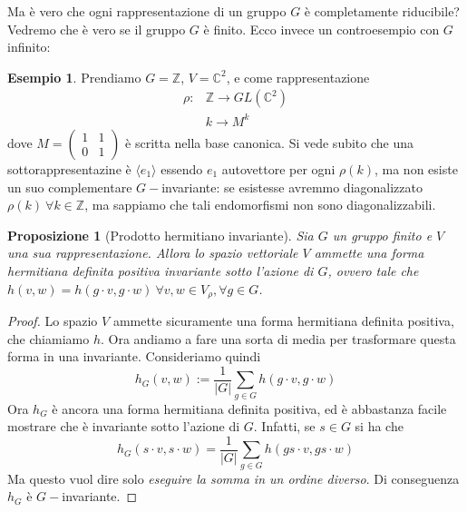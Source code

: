 \documentclass[11pt]{article}
\theoremstyle{plain}
\newtheorem{prop}[thm]{Proposizione}
\theoremstyle{definition}
\newtheorem{exmp}{Esempio}[section]
\theoremstyle{remark}
\newcommand{\C}{\mathbb{C}}
\newcommand{\Z}{\mathbb{Z}}
\newcommand{\dsum}{\displaystyle\sum}
\begin{document}
Ma è vero che ogni rappresentazione di un gruppo $G$ è completamente riducibile?
Vedremo che è vero se il gruppo $G$ è finito. Ecco invece un controesempio con $G$ infinito:
\begin{exmp} Prendiamo $G=\Z$, $V=\C^2$, e come rappresentazione
\begin{align*}
	\rho:&\Z\to GL(\C^2)\\
	&k\to M^k
\end{align*}
dove $M=\begin{pmatrix}
        	1 & 1\\
        	0 & 1
        \end{pmatrix}$ è scritta nella base canonica.\newline
Si vede subito che una sottorappresentazine è $\langle e_1\rangle$ essendo $e_1$ autovettore per ogni $\rho(k)$,
ma non esiste un suo complementare $G-$invariante: se esistesse avremmo diagonalizzato $\rho(k)\ \forall k\in \Z$, ma sappiamo che tali endomorfismi non sono diagonalizzabili.
\end{exmp}



\begin{prop}[Prodotto hermitiano invariante] Sia $G$ un gruppo finito e $V$ una sua rappresentazione. Allora lo spazio vettoriale $V$ ammette una forma hermitiana definita positiva invariante sotto l'azione di $G$, ovvero tale che $h(v,w) = h(g\cdot v, g\cdot w) \ \forall v,w\in V_\rho, \forall g \in G$.
\label{thm:esistenza hermitiana}
\end{prop}
\begin{proof}
Lo spazio $V$ ammette sicuramente una forma hermitiana definita positiva, che chiamiamo $h$. Ora andiamo a fare una sorta di media per trasformare questa forma in una invariante. Consideriamo quindi
\[h_G(v, w) := \frac{1}{|G|} \dsum_{g \in G} h(g\cdot v,g\cdot w) \]
Ora $h_G$ è ancora una forma hermitiana definita positiva, ed è abbastanza facile mostrare che è invariante sotto l'azione di $G$.
Infatti, se $s\in G$ si ha che
\[ h_G(s\cdot v, s\cdot w) = \frac{1}{|G|}\dsum_{g \in G} h(gs\cdot v , gs\cdot w)\]
Ma questo vuol dire solo \emph{eseguire la somma in un ordine diverso}. Di conseguenza $h_G$ è $G-$invariante.
\end{proof}
\end{document}

